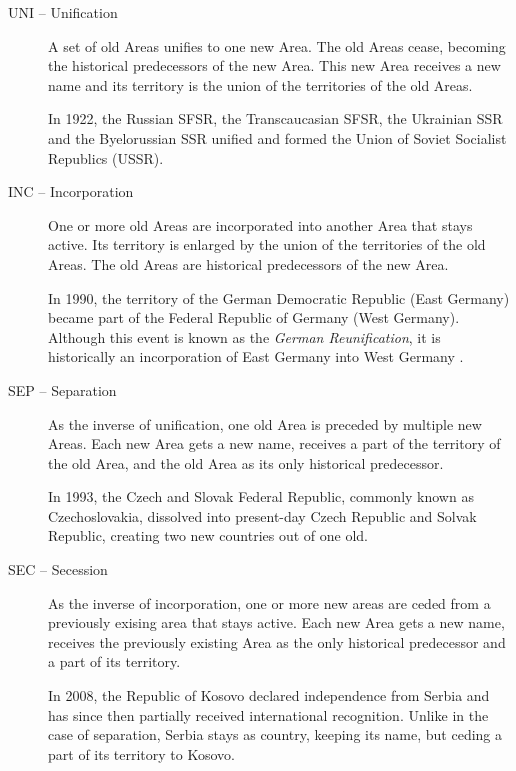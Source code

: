 \begin{description}
  \item[UNI -- Unification]
  A set of old Areas unifies to one new Area. The old Areas cease, becoming the historical predecessors of the new Area. This new Area receives a new name and its territory is the union of the territories of the old Areas. \\[0.25em]
  \begin{footnotesize}
    In 1922, the Russian SFSR, the Transcaucasian SFSR, the Ukrainian SSR and the Byelorussian SSR unified and formed the Union of Soviet Socialist Republics (USSR).
  \end{footnotesize}
  \item[INC -- Incorporation]
  One or more old Areas are incorporated into another Area that stays active. Its territory is enlarged by the union of the territories of the old Areas. The old Areas are historical predecessors of the new Area. \\[0.25em]
  \begin{footnotesize}
    In 1990, the territory of the German Democratic Republic (East Germany) became part of the Federal Republic of Germany (West Germany). Although this event is known as the \emph{German Reunification}, it is historically an incorporation of East Germany into West Germany \cite{incorporationEastWestGermany}.
  \end{footnotesize}
  \item[SEP -- Separation]
  As the inverse of unification, one old Area is preceded by multiple new Areas. Each new Area gets a new name, receives a part of the territory of the old Area, and the old Area as its only historical predecessor. \\[0.25em]
  \begin{footnotesize}
    In 1993, the Czech and Slovak Federal Republic, commonly known as Czechoslovakia, dissolved into present-day Czech Republic and Solvak Republic, creating two new countries out of one old.
  \end{footnotesize}
  \item[SEC -- Secession]
  As the inverse of incorporation, one or more new areas are ceded from a previously exising area that stays active. Each new Area gets a new name, receives the previously existing Area as the only historical predecessor and a part of its territory. \\[0.25em]
  \begin{footnotesize}
    In 2008, the Republic of Kosovo declared independence from Serbia and has since then partially received international recognition. Unlike in the case of separation, Serbia stays as country, keeping its name, but ceding a part of its territory to Kosovo.

\end{footnotesize}
\end{description}
